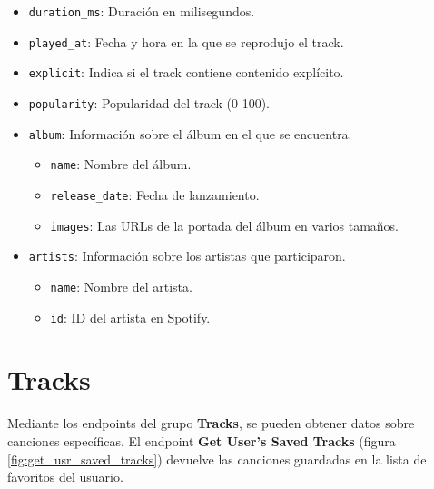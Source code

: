 \begin{itemize}
\begin{itemize}
\begin{itemize}
                        \item \texttt{duration\_ms}: Duración en milisegundos.
                        \item \texttt{played\_at}: Fecha y hora en la que se reprodujo el track.
                        \item \texttt{explicit}: Indica si el track contiene contenido explícito.
                        \item \texttt{popularity}: Popularidad del track (0-100).
                        \item \texttt{album}: Información sobre el álbum en el que se encuentra.
                              \begin{itemize}
                                  \item \texttt{name}: Nombre del álbum.
                                  \item \texttt{release\_date}: Fecha de lanzamiento.
                                  \item \texttt{images}: Las URLs de la portada del álbum en varios tamaños.
                              \end{itemize}
                        \item \texttt{artists}: Información sobre los artistas que participaron.
                              \begin{itemize}
                                  \item \texttt{name}: Nombre del artista.
                                  \item \texttt{id}: ID del artista en Spotify.
                              \end{itemize}
                    \end{itemize}
          \end{itemize}
\end{itemize}

\newpage

\section*{Tracks}

Mediante los endpoints del grupo \textbf{Tracks}, se pueden obtener datos sobre canciones específicas. El endpoint \textbf{Get User's Saved Tracks} (figura \ref{fig:get_usr_saved_tracks}) devuelve las canciones guardadas en la lista de favoritos del usuario.


